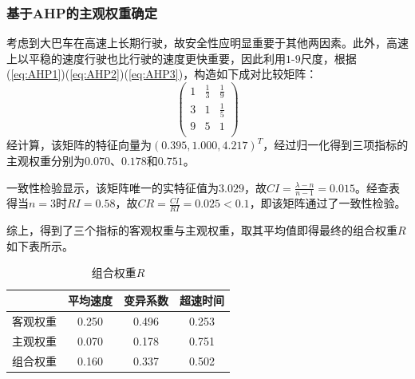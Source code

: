 \documentclass[bwprint]{cumcmthesis}
\begin{document}
            \subsubsection{基于AHP的主观权重确定}
            考虑到大巴车在高速上长期行驶，故安全性应明显重要于其他两因素。此外，高速上以平稳的速度行驶也比行驶的速度更快重要，因此利用$1$-$9$尺度，根据(\ref{eq:AHP1})(\ref{eq:AHP2})(\ref{eq:AHP3})，构造如下成对比较矩阵：
            \[
            \begin{pmatrix}
                1 & \frac{1}{3} & \frac{1}{9}  \\
                3 & 1 & \frac{1}{5}  \\
                9 & 5 & 1  \\
            \end{pmatrix}
            \]
            经计算，该矩阵的特征向量为$(0.395,1.000,4.217)^T$，经过归一化得到三项指标的主观权重分别为$0.070$、$0.178$和$0.751$。

            一致性检验显示，该矩阵唯一的实特征值为$3.029$，故$CI=\frac{\lambda-n}{n-1}=0.015$。经查表得当$n=3$时$RI=0.58$，故$CR=\frac{CI}{RI}=0.025<0.1$，即该矩阵通过了一致性检验。

            综上，得到了三个指标的客观权重与主观权重，取其平均值即得最终的组合权重$R$如下表所示。
            \begin{table}[htbp]
                \centering
                \caption{组合权重$R$}
                    \begin{tabular}{|c|c|c|c|}
                    \hline
                    & 平均速度 & 变异系数 & 超速时间 \\
                    \hline
                    客观权重  & 0.250 & 0.496 & 0.253 \\
                    \hline
                    主观权重  & 0.070 & 0.178 & 0.751 \\
                    \hline
                    组合权重  & 0.160 & 0.337 & 0.502 \\
                    \hline
                    \end{tabular}
                \label{tab:eight}
              \end{table}
\end{document}
